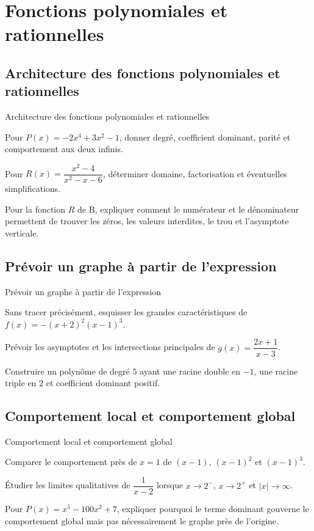 \chapter{Fonctions polynomiales et rationnelles}
\label{workbook:chapter:05}
\section{Architecture des fonctions polynomiales et rationnelles}
\label{workbook:section:05.01}
\begin{exerciseblock}{Architecture des fonctions polynomiales et rationnelles}
\item Pour $P(x)=-2x^4+3x^2-1$, donner degré, coefficient dominant, parité et comportement aux deux infinis.
\item Pour $R(x)=\dfrac{x^2-4}{x^2-x-6}$, déterminer domaine, factorisation et éventuelles simplifications.
\item Pour la fonction $R$ de B, expliquer comment le numérateur et le dénominateur permettent de trouver les zéros, les valeurs interdites, le trou et l'asymptote verticale.
\end{exerciseblock}
\section{Prévoir un graphe à partir de l'expression}
\label{workbook:section:05.02}
\begin{exerciseblock}{Prévoir un graphe à partir de l'expression}
\item Sans tracer précisément, esquisser les grandes caractéristiques de $f(x)=-(x+2)^2(x-1)^3$.
\item Prévoir les asymptotes et les intersections principales de $g(x)=\dfrac{2x+1}{x-3}$.
\item Construire un polynôme de degré $5$ ayant une racine double en $-1$, une racine triple en $2$ et coefficient dominant positif.
\end{exerciseblock}
\section{Comportement local et comportement global}
\label{workbook:section:05.03}
\begin{exerciseblock}{Comportement local et comportement global}
\item Comparer le comportement près de $x=1$ de $(x-1)$, $(x-1)^2$ et $(x-1)^3$.
\item Étudier les limites qualitatives de $\dfrac{1}{x-2}$ lorsque $x\to2^-$, $x\to2^+$ et $|x|\to\infty$.
\item Pour $P(x)=x^5-100x^2+7$, expliquer pourquoi le terme dominant gouverne le comportement global mais pas nécessairement le graphe près de l'origine.
\end{exerciseblock}
